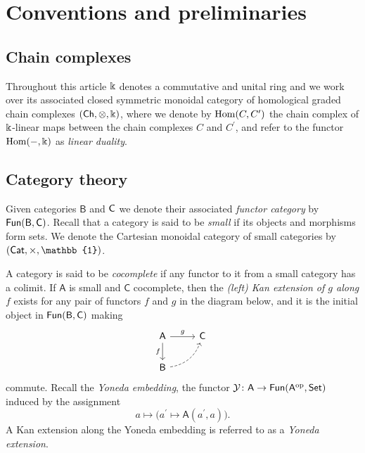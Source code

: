 
\section{Conventions and preliminaries} \label{s:preliminaries}

\subsection{Chain complexes }

Throughout this article $\Bbbk$ denotes a commutative and unital ring and we work over its associated closed symmetric monoidal category of homological graded chain complexes $(\mathsf{Ch}, \otimes, \Bbbk)$, where we denote by $\mathrm{Hom}(C, C^\prime)$ the chain complex of $\Bbbk$-linear maps between the chain complexes $C$ and $C^\prime$, and refer to the functor $\mathrm{Hom}(-, \Bbbk)$ as \textit{linear duality}.

\subsection{Category theory}

Given categories $\mathsf{B}$ and $\mathsf{C}$ we denote their associated \textit{functor category} by $\mathsf{Fun}(\mathsf{B}, \mathsf{C})$.
Recall that a category is said to be \textit{small} if its objects and morphisms form sets.
We denote the Cartesian monoidal category of small categories by $(\Cat, \times, \mathbb{1})$.

A category is said to be \textit{cocomplete} if any functor to it from a small category has a colimit.
If $\mathsf{A}$ is small and $\mathsf{C}$ cocomplete, then the \textit{(left) Kan extension of $g$ along $f$} exists for any pair of functors $f$ and $g$ in the diagram below, and it is the initial object in $\mathsf{Fun}(\mathsf{B}, \mathsf{C})$ making
\begin{equation*}
\begin{tikzcd}[column sep=normal, row sep=normal]
\mathsf{A} \arrow[d, "f"'] \arrow[r, "g"] & \mathsf{C} \\
\mathsf{B} \arrow[dashed, ur, bend right] & \quad
\end{tikzcd}
\end{equation*}
commute.
Recall the \textit{Yoneda embedding}, the functor $\mathcal{Y} \colon \mathsf{A} \to \mathsf{Fun}(\mathsf{A}^{\mathrm{op}}, \mathsf{Set})$ induced by the assignment
\[
a \mapsto \big( a^\prime \mapsto \mathsf{A}(a^\prime, a) \big).
\]
A Kan extension along the Yoneda embedding is referred to as a \textit{Yoneda extension}.


